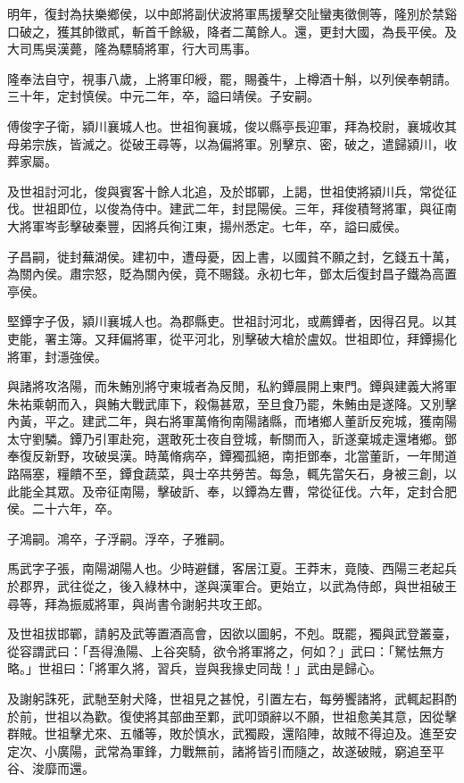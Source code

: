 \begin{pinyinscope}
明年，復封為扶樂鄉侯，以中郎將副伏波將軍馬援擊交阯蠻夷徵側等，隆別於禁谿口破之，獲其帥徵貳，斬首千餘級，降者二萬餘人。還，更封大國，為長平侯。及大司馬吳漢薨，隆為驃騎將軍，行大司馬事。

隆奉法自守，視事八歲，上將軍印綬，罷，賜養牛，上樽酒十斛，以列侯奉朝請。三十年，定封慎侯。中元二年，卒，謚曰靖侯。子安嗣。

傅俊字子衛，潁川襄城人也。世祖徇襄城，俊以縣亭長迎軍，拜為校尉，襄城收其母弟宗族，皆滅之。從破王尋等，以為偏將軍。別擊京、密，破之，遣歸潁川，收葬家屬。

及世祖討河北，俊與賓客十餘人北追，及於邯鄲，上謁，世祖使將潁川兵，常從征伐。世祖即位，以俊為侍中。建武二年，封昆陽侯。三年，拜俊積弩將軍，與征南大將軍岑彭擊破秦豐，因將兵徇江東，揚州悉定。七年，卒，謚曰威侯。

子昌嗣，徙封蕪湖侯。建初中，遭母憂，因上書，以國貧不願之封，乞錢五十萬，為關內侯。肅宗怒，貶為關內侯，竟不賜錢。永初七年，鄧太后復封昌子鐵為高置亭侯。

堅鐔字子伋，潁川襄城人也。為郡縣吏。世祖討河北，或薦鐔者，因得召見。以其吏能，署主簿。又拜偏將軍，從平河北，別擊破大槍於盧奴。世祖即位，拜鐔揚化將軍，封濦強侯。

與諸將攻洛陽，而朱鮪別將守東城者為反閒，私約鐔晨開上東門。鐔與建義大將軍朱祐乘朝而入，與鮪大戰武庫下，殺傷甚眾，至旦食乃罷，朱鮪由是遂降。又別擊內黃，平之。建武二年，與右將軍萬脩徇南陽諸縣，而堵鄉人董訢反宛城，獲南陽太守劉驎。鐔乃引軍赴宛，選敢死士夜自登城，斬關而入，訢遂棄城走還堵鄉。鄧奉復反新野，攻破吳漢。時萬脩病卒，鐔獨孤絕，南拒鄧奉，北當董訢，一年閒道路隔塞，糧饋不至，鐔食蔬菜，與士卒共勞苦。每急，輒先當矢石，身被三創，以此能全其眾。及帝征南陽，擊破訢、奉，以鐔為左曹，常從征伐。六年，定封合肥侯。二十六年，卒。

子鴻嗣。鴻卒，子浮嗣。浮卒，子雅嗣。

馬武字子張，南陽湖陽人也。少時避讎，客居江夏。王莽末，竟陵、西陽三老起兵於郡界，武往從之，後入綠林中，遂與漢軍合。更始立，以武為侍郎，與世祖破王尋等，拜為振威將軍，與尚書令謝躬共攻王郎。

及世祖拔邯鄲，請躬及武等置酒高會，因欲以圖躬，不剋。既罷，獨與武登叢臺，從容謂武曰：「吾得漁陽、上谷突騎，欲令將軍將之，何如？」武曰：「駑怯無方略。」世祖曰：「將軍久將，習兵，豈與我掾史同哉！」武由是歸心。

及謝躬誅死，武馳至射犬降，世祖見之甚悅，引置左右，每勞饗諸將，武輒起斟酌於前，世祖以為歡。復使將其部曲至鄴，武叩頭辭以不願，世祖愈美其意，因從擊群賊。世祖擊尤來、五幡等，敗於慎水，武獨殿，還陷陣，故賊不得迫及。進至安定次、小廣陽，武常為軍鋒，力戰無前，諸將皆引而隨之，故遂破賊，窮追至平谷、浚靡而還。


\end{pinyinscope}
